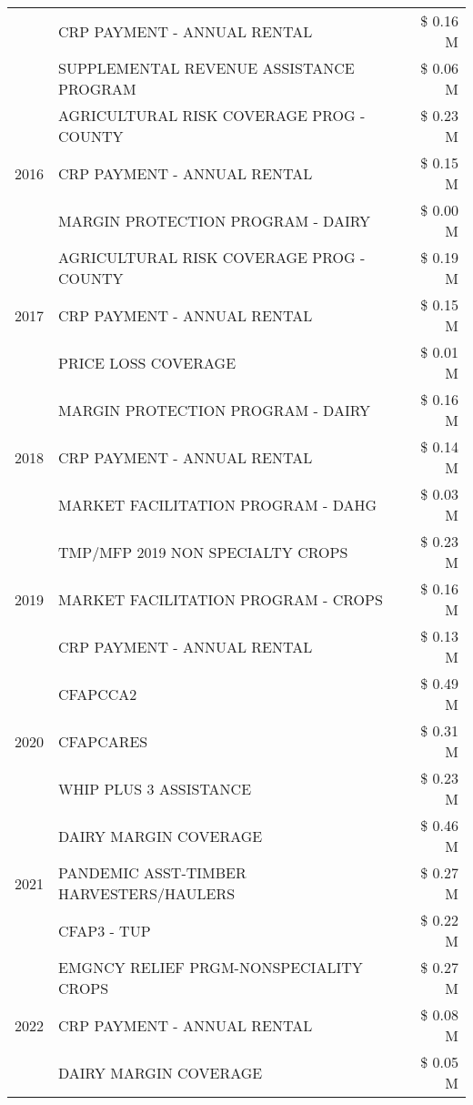 \begin{tabular}{llr}
 & CRP PAYMENT - ANNUAL RENTAL & \$ 0.16 M \\
 & SUPPLEMENTAL REVENUE ASSISTANCE PROGRAM & \$ 0.06 M \\
\cline{1-3}
\multirow[t]{3}{*}{2016} & AGRICULTURAL RISK COVERAGE PROG - COUNTY & \$ 0.23 M \\
 & CRP PAYMENT - ANNUAL RENTAL & \$ 0.15 M \\
 & MARGIN PROTECTION PROGRAM - DAIRY & \$ 0.00 M \\
\cline{1-3}
\multirow[t]{3}{*}{2017} & AGRICULTURAL RISK COVERAGE PROG - COUNTY & \$ 0.19 M \\
 & CRP PAYMENT - ANNUAL RENTAL & \$ 0.15 M \\
 & PRICE LOSS COVERAGE & \$ 0.01 M \\
\cline{1-3}
\multirow[t]{3}{*}{2018} & MARGIN PROTECTION PROGRAM - DAIRY & \$ 0.16 M \\
 & CRP PAYMENT - ANNUAL RENTAL & \$ 0.14 M \\
 & MARKET FACILITATION PROGRAM - DAHG & \$ 0.03 M \\
\cline{1-3}
\multirow[t]{3}{*}{2019} & TMP/MFP 2019 NON SPECIALTY CROPS & \$ 0.23 M \\
 & MARKET FACILITATION PROGRAM - CROPS & \$ 0.16 M \\
 & CRP PAYMENT - ANNUAL RENTAL & \$ 0.13 M \\
\cline{1-3}
\multirow[t]{3}{*}{2020} & CFAPCCA2 & \$ 0.49 M \\
 & CFAPCARES & \$ 0.31 M \\
 & WHIP PLUS 3 ASSISTANCE & \$ 0.23 M \\
\cline{1-3}
\multirow[t]{3}{*}{2021} & DAIRY MARGIN COVERAGE & \$ 0.46 M \\
 & PANDEMIC ASST-TIMBER HARVESTERS/HAULERS & \$ 0.27 M \\
 & CFAP3 - TUP & \$ 0.22 M \\
\cline{1-3}
\multirow[t]{3}{*}{2022} & EMGNCY RELIEF PRGM-NONSPECIALITY CROPS & \$ 0.27 M \\
 & CRP PAYMENT - ANNUAL RENTAL & \$ 0.08 M \\
 & DAIRY MARGIN COVERAGE & \$ 0.05 M \\
\cline{1-3}
\bottomrule
\end{tabular}

